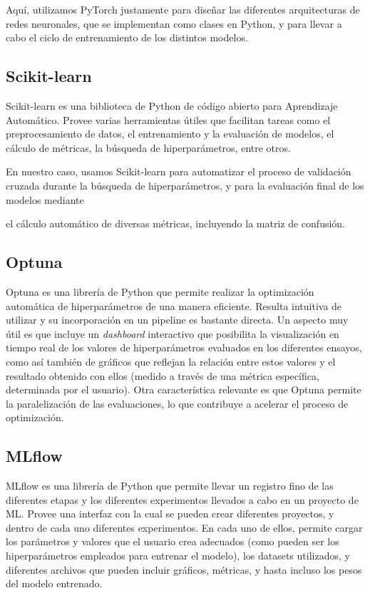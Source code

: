 \documentclass[../../main.tex]{subfiles}
\begin{document}
Aquí, utilizamos PyTorch justamente para diseñar las diferentes arquitecturas de redes
neuronales, que se implementan como clases en Python, y para llevar a cabo el ciclo de
entrenamiento de los distintos modelos.

\subsection{Scikit-learn}
Scikit-learn \cite{scikitlearn-docs} es una biblioteca de Python de código abierto para
Aprendizaje Automático. Provee varias herramientas útiles que facilitan tareas como el
preprocesamiento de datos, el entrenamiento y la evaluación de modelos, el cálculo de
métricas, la búsqueda de hiperparámetros, entre otros.

En nuestro caso, usamos Scikit-learn para automatizar el proceso de validación cruzada
durante la búsqueda de hiperparámetros, y para la evaluación final de los modelos mediante

el cálculo automático de diversas métricas, incluyendo la matriz de confusión.

\subsection{Optuna}
Optuna \cite{optuna-docs} es una librería de Python que permite realizar la optimización
automática de hiperparámetros de una manera eficiente. Resulta intuitiva de utilizar y su
incorporación en un pipeline es bastante directa. Un aspecto muy útil es que incluye un
\textit{dashboard} interactivo que posibilita la visualización en tiempo real de los
valores de hiperparámetros evaluados en los diferentes ensayos, como así también de
gráficos que reflejan la relación entre estos valores y el resultado obtenido con ellos
(medido a través de una métrica específica, determinada por el usuario). Otra
característica relevante es que Optuna permite la paralelización de las evaluaciones, lo
que contribuye a acelerar el proceso de optimización.

\subsection{MLflow}
MLflow \cite{mlflow-docs} es una librería de Python que permite llevar un registro fino de
las diferentes etapas y los diferentes experimentos llevados a cabo en un proyecto de ML.
Provee una interfaz con la cual se pueden crear diferentes proyectos, y dentro de cada uno
diferentes experimentos. En cada uno de ellos, permite cargar los parámetros y valores que
el usuario crea adecuados (como pueden ser los hiperparámetros empleados para entrenar el
modelo), los datasets utilizados, y diferentes archivos que pueden incluir gráficos,
métricas, y hasta incluso los pesos del modelo entrenado.
\end{document}

